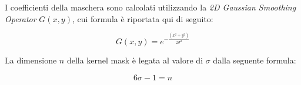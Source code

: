 I coefficienti della maschera sono calcolati utilizzando la \emph{2D Gaussian Smoothing Operator} $G(x,y)$, cui formula è riportata qui di seguito:

\begin{equation}
G(x, y) = e^{- \frac{(x^2 + y^2)}{2\sigma^2}}
\end{equation}

La dimensione $n$ della kernel mask è legata al valore di $\sigma$ dalla seguente formula:

\begin{equation}
6\sigma - 1 = n
\end{equation}

